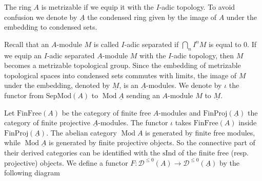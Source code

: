 \documentclass{article}
\theoremstyle{plain}
\theoremstyle{definition}
\theoremstyle{remark}
\DeclareMathOperator{\modcat}{Mod}
\newcommand{\D}{\mathcal{D}}
\begin{document}
The ring $ A $ is metrizable if we equip it with the $ I $-adic topology.
To avoid confusion we denote by $ \underline{A} $ the condensed ring given by the image of $ A $ under the embedding to condensed sets.

Recall that an $ A $-module $ M $ is called $ I $-adic separated if $ \bigcap _{n} I ^{n}M $ is equal to $ 0 $.
If we equip an $ I $-adic separated $ A $-module $ M $ with the $ I $-adic topology, then $ M $ becomes a metrizable topological group.
Since the embedding of metrizable topological spaces into condensed sets commutes with limits, the image of $ M $ under the embedding, denoted by $ \underline{M} $,
is an $ \underline{A} $-modules.
We denote by $ \iota $ the functor from $ \mathrm{SepMod}(A) $ to $ \modcat{\underline{A}} $ sending an $ A $-module $ M $ to $ \underline{M} $.

Let $ \mathrm{FinFree}(A) $ be the category of finite free $ A $-modules and $ \mathrm{FinProj}(\underline{A}) $ the category of finite projective
$ \underline{A} $-modules.
The functor $ \iota $ takes $ \mathrm{FinFree}(A) $ inside $ \mathrm{FinProj}(\underline{A}) $.
The abelian category $ \modcat{A} $ is generated by finite free modules, while $ \modcat{\underline{A}} $ is generated by finite projective objects.
So the connective part of their derived categories can be identified with the $ \mathrm{sInd} $ of the finite free (resp. projective) objects.
We define a functor $ F: \D ^{\leq 0}(A)\to \D ^{\leq 0}(\underline{A}) $ by the following diagram
\begin{figure}[H]
\centering
{}
\end{figure}

\printbibliography
\end{document}
